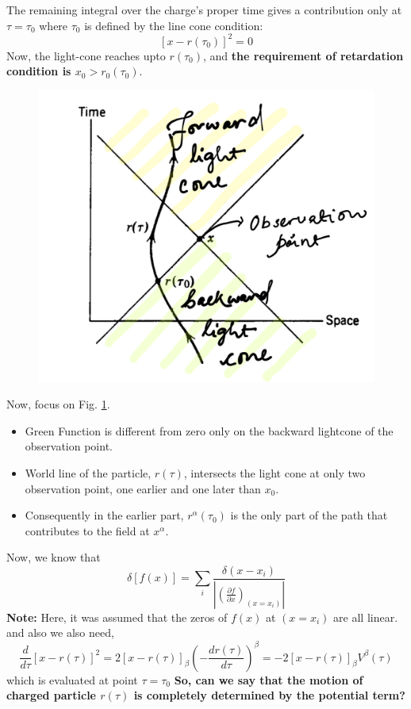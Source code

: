 \documentclass[11pt]{report}
\newcommand{\pe}[2]{\frac{\partial{#1}}{\partial{#2}}}
\newcommand{\cc}[1]{\left({#1}\right)}
\newcommand{\rr}[1]{\left[{#1}\right]}
\begin{document}
The remaining integral over the charge's proper time gives a contribution only at $\tau=\tau_0$ where $\tau_0$ is defined by the line cone condition:
\begin{equation}\label{lc}
\rr{x-r(\tau_0)}^2=0
\end{equation}
Now, the light-cone reaches upto $r(\tau_0)$, and \textbf{the requirement of retardation condition is $x_0>r_0(\tau_0)$}.
\begin{figure}[h!]
\includegraphics[width=0.7\linewidth]{lienardpot.png}
\label{radlineard}
\end{figure}
Now, focus on Fig. \ref{radlineard}. 
\begin{itemize}
\item Green Function is different from zero only on the backward lightcone of the observation point.
\item World line of the particle, $r(\tau)$, intersects the light cone at only two observation point, one earlier and one later than $x_0$.
\item Consequently in the earlier part, $r^\alpha(\tau_0)$ is the only part of the path that contributes to the field at $x^\alpha$.
\end{itemize}
Now, we know that
\begin{equation}\label{deltatau}
\delta[f(x)]=\sum_i \frac{\delta(x-x_i)}{|\cc{\pe{f}{x}}_{(x=x_i)}|}
\end{equation}
\textbf{Note:} Here, it was assumed that the zeros of $f(x)$ at $(x=x_i)$ are all linear.\\
and also we also need,
\begin{equation}
\frac{d}{d\tau}\rr{x-r(\tau)}^2 =2\rr{x-r(\tau)}_\beta \cc{-\frac{d r(\tau)}{d\tau}}^\beta=-2\rr{x-r(\tau)}_\beta V^\beta(\tau)
\end{equation}
which is evaluated at point $\tau=\tau_0$
\textbf{So, can we say that the motion of charged particle $r(\tau)$ is completely determined by the potential term?}
\end{document}
